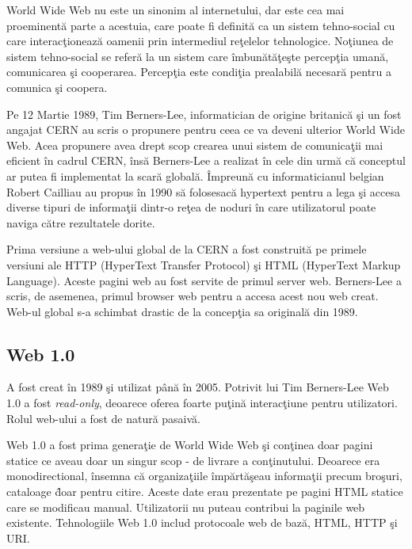 \documentclass[12pt, a4paper]{report}
\begin{document}
World Wide Web nu este un sinonim al internetului, dar este cea mai proeminent\u a parte a acestuia, care poate fi definit\u a ca un sistem tehno-social cu care interac\c tioneaz\u a oamenii prin intermediul re\c telelor tehnologice. No\c tiunea de sistem tehno-social se refer\u a la un sistem care \^imbun\u at\u a\c te\c ste percep\c tia uman\u a, comunicarea \c si cooperarea. Percep\c tia este condi\c tia prealabil\u a necesar\u a pentru a comunica \c si coopera.

Pe 12 Martie 1989, Tim Berners-Lee, informatician de origine britanic\u a \c si un fost angajat CERN au scris o propunere pentru ceea ce va deveni ulterior World Wide Web. Acea propunere avea drept scop crearea unui sistem de comunica\c tii mai eficient \^in cadrul CERN, \^ins\u a Berners-Lee a realizat \^in cele din urm\u a c\u a conceptul ar putea fi implementat la scar\u a global\u a. \^Impreun\u a cu informaticianul belgian Robert Cailliau au propus \^in 1990 s\u a folosesac\u a hypertext pentru a lega \c si accesa diverse tipuri de informa\c tii dintr-o re\c tea de noduri \^in care utilizatorul poate naviga c\u atre rezultatele dorite.

Prima versiune a web-ului global de la CERN a fost construit\u a pe primele versiuni ale HTTP (HyperText Transfer Protocol) \c si HTML (HyperText Markup Language). Aceste pagini web au fost servite de primul server web. Berners-Lee a scris, de asemenea, primul browser web pentru a accesa acest nou web creat. Web-ul global s-a schimbat drastic de la concep\c tia sa original\u a din 1989.

\subsection{Web 1.0}

A fost creat \^in 1989 \c si utilizat p\^an\u a \^in 2005. Potrivit lui Tim Berners-Lee Web 1.0 a fost \emph{read-only}, deoarece oferea foarte pu\c tin\u a interac\c tiune pentru utilizatori. Rolul web-ului a fost de natur\u a pasaiv\u a.

Web 1.0 a fost prima genera\c tie de World Wide Web \c si con\c tinea doar pagini statice ce aveau doar un singur scop - de livrare a con\c tinutului. Deoarece era monodirectional, \^ insemna c\u a organiza\c tiile \^ imp\u art\u a\c seau informa\c tii precum bro\c suri, cataloage \^ doar pentru citire. Aceste date erau prezentate pe pagini HTML statice care se modificau manual. Utilizatorii nu puteau contribui la paginile web existente. Tehnologiile Web 1.0 includ protocoale web de baz\u a, HTML, HTTP \c si URI. \cite{web-1}
\end{document}
